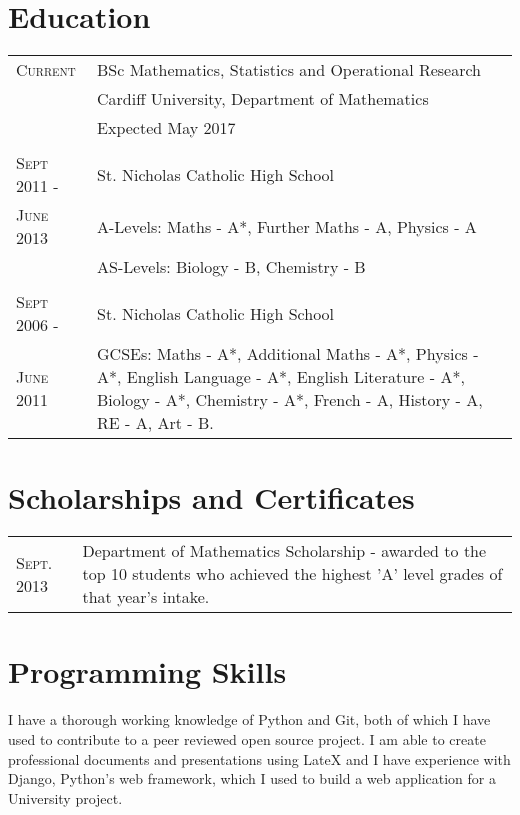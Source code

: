 \documentclass[a4paper]{article}
\begin{document}
\section{Education}
\begin{tabularx}{\textwidth}{lX}

\textsc{Current} & \textsc BSc Mathematics, Statistics and Operational Research \\
&\normalsize Cardiff University, Department of Mathematics\\
& Expected May 2017\\
\\
\textsc{Sept 2011 -} & St. Nicholas Catholic High School\\
\textsc{June 2013} & A-Levels: Maths - A*, Further Maths - A, Physics - A\\
& AS-Levels: Biology - B, Chemistry - B\\
\\
\textsc{Sept 2006 -} & St. Nicholas Catholic High School\\
\textsc{June 2011} & GCSEs: Maths - A*, Additional Maths - A*, Physics - A*, English Language - A*, English Literature - A*, Biology - A*, Chemistry - A*, French - A, History - A, RE - A, Art - B.\\

\end{tabularx}
\section{Scholarships and Certificates}
\begin{tabularx}{\textwidth}{lX}

\textsc{Sept.} 2013 & Department of Mathematics Scholarship - awarded to the top 10 students who achieved the highest 'A' level grades of that year's intake.\\

\end{tabularx}
\section{Programming Skills}
I have a thorough working knowledge of Python and Git, both of which I have used to contribute to a peer reviewed open source project. I am able to create professional documents and presentations using LateX and I have experience with Django, Python's web framework, which I used to build a web application for a University project.
\end{document}

